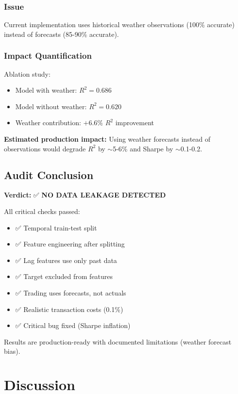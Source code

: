 \documentclass[11pt,a4paper]{article}
\begin{document}
\subsubsection{Issue}

Current implementation uses historical weather observations (100\% accurate) instead of forecasts (85-90\% accurate).

\subsubsection{Impact Quantification}

Ablation study:
\begin{itemize}
    \item Model with weather: $R^2 = 0.686$
    \item Model without weather: $R^2 = 0.620$
    \item Weather contribution: $+6.6\%$ $R^2$ improvement
\end{itemize}

\textbf{Estimated production impact:} Using weather forecasts instead of observations would degrade $R^2$ by $\sim$5-6\% and Sharpe by $\sim$0.1-0.2.

\subsection{Audit Conclusion}

\textbf{Verdict:} ✅ \textbf{NO DATA LEAKAGE DETECTED}

All critical checks passed:
\begin{itemize}
    \item ✅ Temporal train-test split
    \item ✅ Feature engineering after splitting
    \item ✅ Lag features use only past data
    \item ✅ Target excluded from features
    \item ✅ Trading uses forecasts, not actuals
    \item ✅ Realistic transaction costs (0.1\%)
    \item ✅ Critical bug fixed (Sharpe inflation)
\end{itemize}

Results are production-ready with documented limitations (weather forecast bias).

\section{Discussion}
\end{document}
